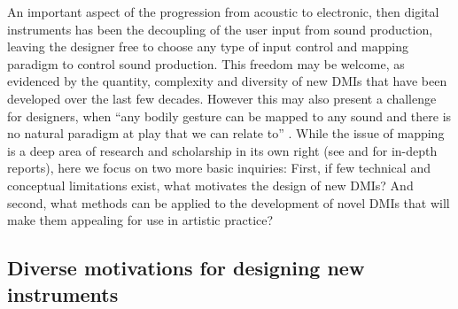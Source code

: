 \documentclass[letterpaper, 12pt]{article}
\begin{document}
An important aspect of the progression from acoustic to electronic, then digital instruments has been the decoupling of the user input from sound production, leaving the designer free to choose any type of input control and mapping paradigm to control sound production. This freedom may be welcome, as evidenced by the quantity, complexity and diversity of new DMIs that have been developed over the last few decades.
However this may also present a challenge for designers, when ``any bodily gesture can be mapped to any sound and there is no natural paradigm at play that we can relate to'' \citep*[p. 34]{Magnusson2019}. While the issue of mapping is a deep area of research and scholarship in its own right (see \citet{os-mapping-2002} and \citet{cmj-mapping-2014} for in-depth reports), here we focus on two more basic inquiries: First, if few technical and conceptual limitations exist, what motivates the design of new DMIs? And second, what methods can be applied to the development of novel DMIs that will make them appealing for use in artistic practice? 


\subsection{Diverse motivations for designing new instruments}
\label{sec:diverse-motivations-for-designing-new-instruments}
\end{document}
